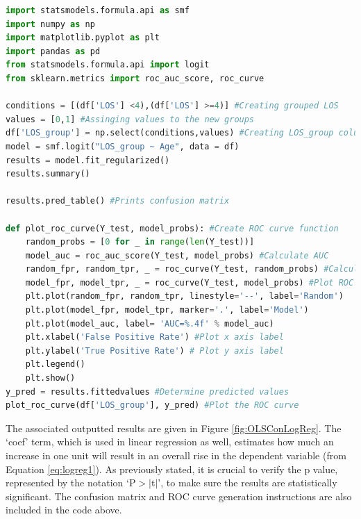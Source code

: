 \documentclass[../thesis.tex]{subfiles}
\begin{document}
\begin{lstlisting}[language = python]
import statsmodels.formula.api as smf
import numpy as np
import matplotlib.pyplot as plt
import pandas as pd
from statsmodels.formula.api import logit
from sklearn.metrics import roc_auc_score, roc_curve

conditions = [(df['LOS'] <4),(df['LOS'] >=4)] #Creating grouped LOS
values = [0,1] #Assinging values to the new groups 
df['LOS_group'] = np.select(conditions,values) #Creating LOS_group column
model = smf.logit("LOS_group ~ Age", data = df)
results = model.fit_regularized()
results.summary()

results.pred_table() #Prints confusion matrix

def plot_roc_curve(Y_test, model_probs): #Create ROC curve function
    random_probs = [0 for _ in range(len(Y_test))] 
    model_auc = roc_auc_score(Y_test, model_probs) #Calculate AUC
    random_fpr, random_tpr, _ = roc_curve(Y_test, random_probs) #Calculate ROC Curve for Random Model
    model_fpr, model_tpr, _ = roc_curve(Y_test, model_probs) #Plot ROC curves
    plt.plot(random_fpr, random_tpr, linestyle='--', label='Random')
    plt.plot(model_fpr, model_tpr, marker='.', label='Model')
    plt.plot(model_auc, label= 'AUC=%.4f' % model_auc) 
    plt.xlabel('False Positive Rate') #Plot x axis label 
    plt.ylabel('True Positive Rate') # Plot y axis label
    plt.legend()
    plt.show()
y_pred = results.fittedvalues #Determine predicted values
plot_roc_curve(df['LOS_group'], y_pred) #Plot the ROC curve
\end{lstlisting}


The associated outputted results are given in Figure \ref{fig:OLSConLogReg}. The `coef' term, which is used in linear regression as well, estimates how much an increase in one unit will result in an overall rise in the dependent variable (from Equation \eqref{eq:logreg1}). As previously stated, it is crucial to verify the p value, represented by the notation `P$> |$t$|$', to make sure the results are statistically significant. The confusion matrix and ROC curve generation instructions are also included in the code above.
\end{document}

